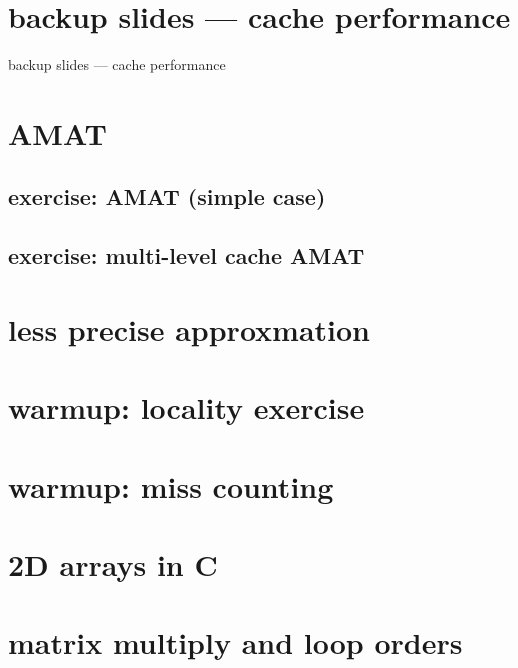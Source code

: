 \section{backup slides --- cache performance}
\begin{frame}{backup slides --- cache performance}
\end{frame}

\section{AMAT}


\subsection{exercise: AMAT (simple case)}


\subsection{exercise: multi-level cache AMAT}


\section{less precise approxmation}


\section{warmup: locality exercise}  %


\section{warmup: miss counting}


\section{2D arrays in C}



\section{matrix multiply and loop orders}

%


